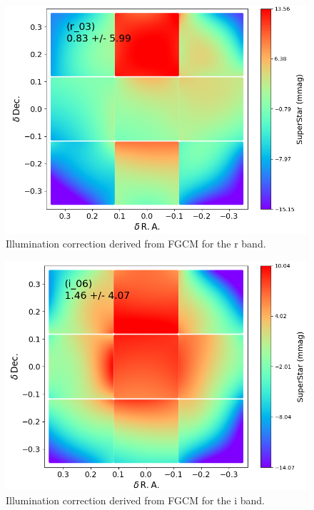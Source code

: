 \begin{figure}
  \includegraphics{photometric_calibration_figures/illumcorr_r.png}
  \caption{Illumination correction derived from FGCM for the r band.}
\end{figure}

\begin{figure}
  \includegraphics{photometric_calibration_figures/illumcorr_i.png}
  \caption{Illumination correction derived from FGCM for the i band.}
\end{figure}

